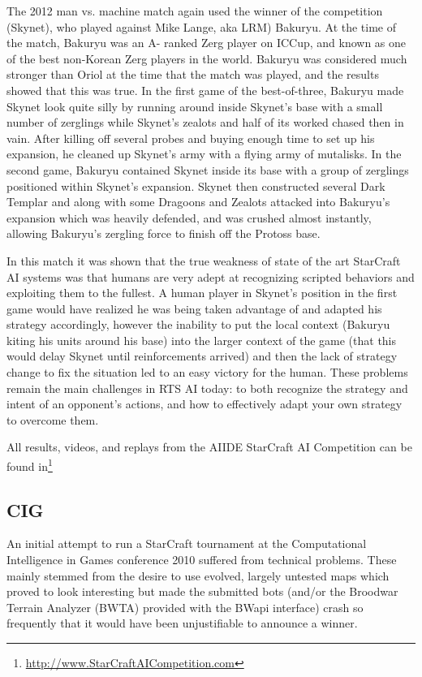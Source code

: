 \documentclass[journal]{IEEEtran}
\begin{document}
The 2012 man vs. machine match again used the winner of the competition (Skynet), who played against
Mike Lange, aka LRM) Bakuryu. At the time of the match, Bakuryu was an A- ranked Zerg player on ICCup,
and known as one of the best non-Korean Zerg players in the world. Bakuryu was considered much
stronger than Oriol at the time that the match was played, and the results showed that this was true.
In the first game of the best-of-three, Bakuryu made Skynet look quite silly by running around inside
Skynet's base with a small number of zerglings while Skynet's zealots and half of its worked chased
then in vain. After killing off several probes and buying enough time to set up his expansion, he
cleaned up Skynet's army with a flying army of mutalisks. In the second game, Bakuryu contained Skynet
inside its base with a group of zerglings positioned within Skynet's expansion. Skynet then constructed
several Dark Templar and along with some Dragoons and Zealots attacked into Bakuryu's expansion which
was heavily defended, and was crushed almost instantly, allowing Bakuryu's zergling force to finish
off the Protoss base. 

In this match it was shown that the true weakness of state of the art StarCraft AI systems was that
humans are very adept at recognizing scripted behaviors and exploiting them to the fullest. A human
player in Skynet's position in the first game would have realized he was being taken advantage of and
adapted his strategy accordingly, however the inability to put the local context (Bakuryu kiting his
units around his base) into the larger context of the game (that this would delay Skynet until
reinforcements arrived) and then the lack of strategy change to fix the situation led to an easy
victory for the human. These problems remain the main challenges in RTS AI today: to both recognize
the strategy and intent of an opponent's actions, and how to effectively adapt your own strategy to 
overcome them.

All results, videos, and replays from the AIIDE StarCraft AI Competition can be found in\footnote{\url{http://www.StarCraftAICompetition.com}}



\subsection{CIG}
\label{sec:cig2011}

An initial attempt to run a StarCraft tournament at the Computational
Intelligence in Games conference 2010 suffered from technical problems.
These mainly stemmed from the desire to use evolved, largely untested
maps which proved to look interesting but made the submitted bots 
(and/or the Broodwar Terrain Analyzer (BWTA) provided with the BWapi interface) crash
so frequently that it would have been unjustifiable to announce a winner.
\end{document}

